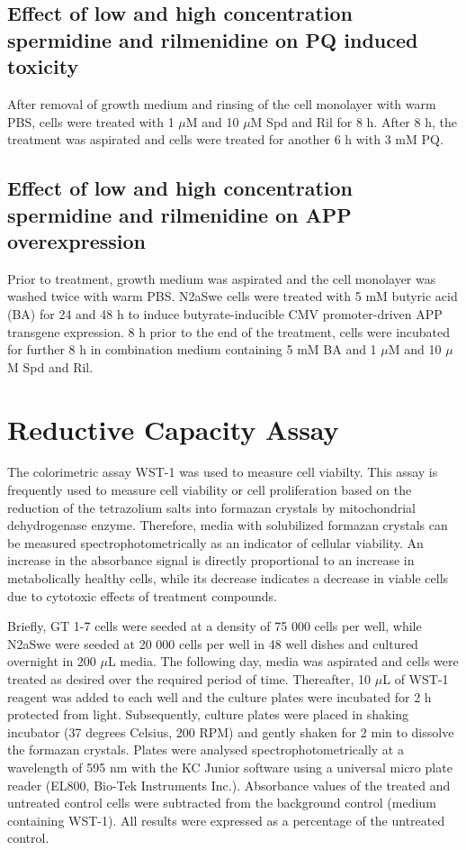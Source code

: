\subsection{Effect of low and high concentration spermidine and rilmenidine on PQ induced toxicity}
After removal of growth medium and rinsing of the cell monolayer with warm PBS, cells were treated with 1 $\mu$M and 10 $\mu$M Spd and Ril for 8 h. After 8 h, the treatment was aspirated and cells were treated for another 6 h with 3 mM PQ. 

\subsection{Effect of low and high concentration spermidine and rilmenidine on APP overexpression}
Prior to treatment, growth medium was aspirated and the cell monolayer was washed twice with warm PBS. N2aSwe cells were treated with 5 mM butyric acid (BA) for 24 and 48 h to induce butyrate-inducible CMV promoter-driven APP transgene expression. 8 h prior to the end of the treatment, cells were incubated for further 8 h in combination medium containing 5 mM BA and 1 $\mu$M and 10 $\mu$M Spd and Ril.

\section{Reductive Capacity Assay}
The colorimetric assay WST-1 was used to measure cell viabilty. This assay is frequently used to measure cell viability or cell proliferation based on the reduction of the tetrazolium salts into formazan crystals by mitochondrial dehydrogenase enzyme. Therefore, media with solubilized formazan crystals can be measured spectrophotometrically as an indicator of cellular viability. An increase in the absorbance signal is directly proportional to an increase in metabolically healthy cells, while its decrease indicates a decrease in viable cells due to cytotoxic effects of treatment compounds. 

Briefly, GT 1-7 cells were seeded at a density of 75 000 cells per well, while N2aSwe were seeded at 20 000 cells per well in 48 well dishes and cultured overnight in 200 $\mu$L media. The following day, media was aspirated and cells were treated as desired over the required period of time. Thereafter, 10 $\mu$L of WST-1 reagent was added to each well and the culture plates were incubated for 2 h protected from light. Subsequently, culture plates were placed in shaking incubator (37 degrees Celsius, 200 RPM) and gently shaken for 2 min to dissolve the formazan crystals. Plates were analysed spectrophotometrically at a wavelength of 595 nm with the KC Junior software using a universal micro plate reader (EL800, Bio-Tek Instruments Inc.). Absorbance values of the treated and untreated control cells were subtracted from the background control (medium containing WST-1). All results were expressed as a percentage of the untreated control.

